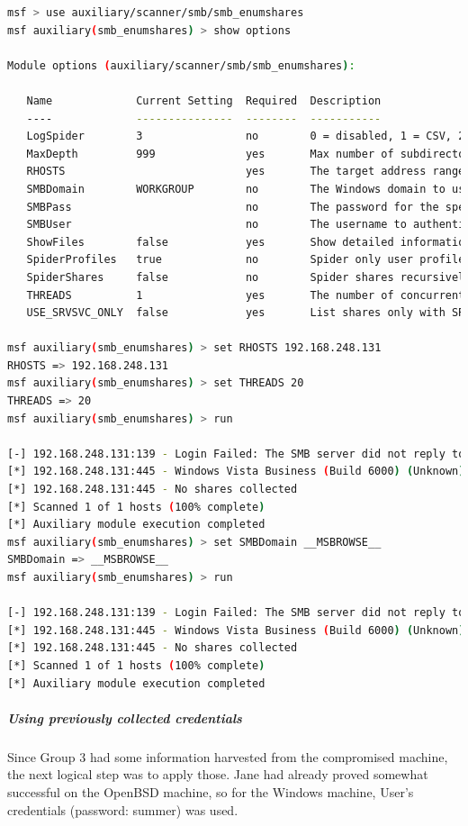 \begin{lstlisting}[language=bash,caption={Enumerating shares}]
msf > use auxiliary/scanner/smb/smb_enumshares
msf auxiliary(smb_enumshares) > show options

Module options (auxiliary/scanner/smb/smb_enumshares):

   Name             Current Setting  Required  Description
   ----             ---------------  --------  -----------
   LogSpider        3                no        0 = disabled, 1 = CSV, 2 = table (txt), 3 = one liner (txt) (accepted: 0, 1, 2, 3)
   MaxDepth         999              yes       Max number of subdirectories to spider
   RHOSTS                            yes       The target address range or CIDR identifier
   SMBDomain        WORKGROUP        no        The Windows domain to use for authentication
   SMBPass                           no        The password for the specified username
   SMBUser                           no        The username to authenticate as
   ShowFiles        false            yes       Show detailed information when spidering
   SpiderProfiles   true             no        Spider only user profiles when share = C$
   SpiderShares     false            no        Spider shares recursively
   THREADS          1                yes       The number of concurrent threads
   USE_SRVSVC_ONLY  false            yes       List shares only with SRVSVC

msf auxiliary(smb_enumshares) > set RHOSTS 192.168.248.131
RHOSTS => 192.168.248.131
msf auxiliary(smb_enumshares) > set THREADS 20
THREADS => 20
msf auxiliary(smb_enumshares) > run

[-] 192.168.248.131:139 - Login Failed: The SMB server did not reply to our request
[*] 192.168.248.131:445 - Windows Vista Business (Build 6000) (Unknown)
[*] 192.168.248.131:445 - No shares collected
[*] Scanned 1 of 1 hosts (100% complete)
[*] Auxiliary module execution completed
msf auxiliary(smb_enumshares) > set SMBDomain __MSBROWSE__
SMBDomain => __MSBROWSE__
msf auxiliary(smb_enumshares) > run

[-] 192.168.248.131:139 - Login Failed: The SMB server did not reply to our request
[*] 192.168.248.131:445 - Windows Vista Business (Build 6000) (Unknown)
[*] 192.168.248.131:445 - No shares collected
[*] Scanned 1 of 1 hosts (100% complete)
[*] Auxiliary module execution completed
\end{lstlisting}

\subparagraph{Using previously collected credentials}
Since Group 3 had some information harvested from the compromised machine, the next logical step was to apply those. Jane had already proved somewhat successful on the OpenBSD machine, so for the Windows machine, User's credentials (password: summer) was used.

